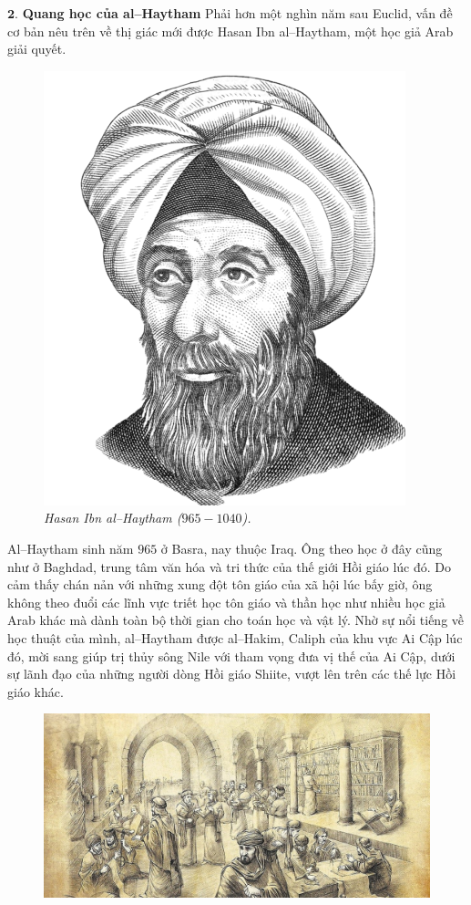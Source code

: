 \begin{multicols}{2}
	\vskip 0.1cm 
	$\pmb{2.}$ \textbf{\color{lichsutoanhoc}Quang học của al--Haytham}
	\vskip 0.1cm
	Phải hơn một nghìn năm sau Euclid, vấn đề cơ bản nêu trên về thị giác mới được Hasan Ibn al--Haytham, một học giả Arab giải quyết.
	\begin{figure}[H]
		\vspace*{-5pt}
		\centering
		\captionsetup{labelformat= empty, justification=centering}
		\includegraphics[width= 0.7\linewidth]{2}
		\caption{\small\textit{\color{lichsutoanhoc}Hasan Ibn al--Haytham ($965-1040$).}}
		\vspace*{-10pt}
	\end{figure}
	Al--Haytham sinh năm $965$ ở Basra, nay thuộc Iraq. Ông theo học ở đây cũng như ở Baghdad, trung tâm văn hóa và tri thức của thế giới Hồi giáo lúc đó. Do cảm thấy chán nản với những xung đột tôn giáo của xã hội lúc bấy giờ, ông không theo đuổi các lĩnh vực triết học tôn giáo và thần học như nhiều học giả Arab khác mà dành toàn bộ thời gian cho toán học và vật lý.
	\vskip 0.1cm
	Nhờ sự nổi tiếng về học thuật của mình, al--Haytham được al--Hakim, Caliph của khu vực Ai Cập lúc đó, mời sang giúp trị thủy sông Nile với tham vọng đưa vị thế của Ai Cập, dưới sự lãnh đạo của những người dòng Hồi giáo Shiite, vượt lên trên các thế lực Hồi giáo khác.
	\begin{figure}[H]
		\vspace*{-5pt}
		\centering
		\captionsetup{labelformat= empty, justification=centering}
		\includegraphics[width= 1\linewidth]{3}

\end{figure}
\end{multicols}
